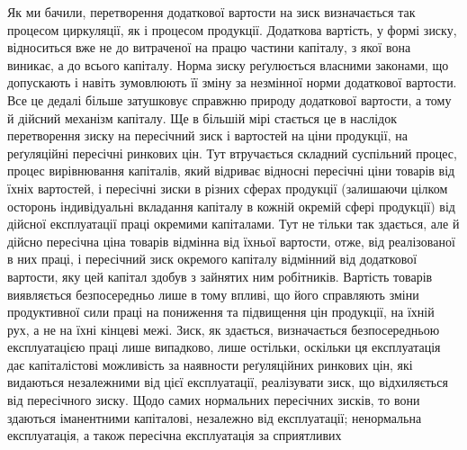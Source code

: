 Як ми бачили, перетворення додаткової вартости на зиск визначається так
процесом циркуляції, як і процесом продукції. Додаткова вартість, у формі зиску,
відноситься вже не до витраченої на працю частини капіталу, з якої вона виникає,
а до всього капіталу. Норма зиску реґулюється власними законами, що
допускають і навіть зумовлюють її зміну за незмінної норми додаткової
вартости. Все це дедалі більше затушковує справжню природу додаткової вартости,
а тому й дійсний механізм капіталу. Ще в більшій мірі стається це
в наслідок перетворення зиску на пересічний зиск і вартостей на ціни продукції,
на реґуляційні пересічні ринкових цін. Тут втручається складний суспільний
процес, процес вирівнювання капіталів, який відриває відносні пересічні
ціни товарів від їхніх вартостей, і пересічні зиски в різних сферах продукції
(залишаючи цілком осторонь індивідуальні вкладання капіталу в кожній окремій
сфері продукції) від дійсної експлуатації праці окремими капіталами. Тут не
тільки так здається, але й дійсно пересічна ціна товарів відмінна від їхньої
вартости, отже, від реалізованої в них праці, і пересічний зиск окремого капіталу
відмінний від додаткової вартости, яку цей капітал здобув з зайнятих ним
робітників. Вартість товарів виявляється безпосередньо лише в тому впливі, що
його справляють зміни продуктивної сили праці на пониження та підвищення цін
продукції, на їхній рух, а не на їхні кінцеві межі. Зиск, як здається, визначається
безпосередньою експлуатацією праці лише випадково, лише остільки,
оскільки ця експлуатація дає капіталістові можливість за наявности реґуляційних
ринкових цін, які видаються незалежними від цієї експлуатації, реалізувати
зиск, що відхиляється від пересічного зиску. Щодо самих нормальних пересічних
зисків, то вони здаються іманентними капіталові, незалежно від експлуатації;
ненормальна експлуатація, а також пересічна експлуатація за сприятливих
\parbreak{}  %
